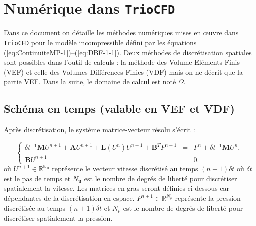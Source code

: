 \chapter{\label{sub:Numerique-dans-TrioCFD}Num\'erique dans \texttt{TrioCFD}}
Dans ce document on d\'etaille les m\'ethodes num\'eriques mises en \oe uvre
dans \texttt{TrioCFD} pour le mod\`ele incompressible d\'efini par les
\'equations (\ref{eq:ContinuiteMP-1})--(\ref{eq:DBF-1-1}). Deux m\'ethodes
de discr\'etisation spatiales sont possibles dans l'outil de calculs
: la m\'ethode des Volume-El\'ements Finis (VEF) et celle des Volumes
Diff\'erences Finies (VDF) mais on ne d\'ecrit que la partie VEF. Dans
la suite, le domaine de calcul est not\'e $\Omega$.


\section{Sch\'ema en temps (valable en VEF et VDF)}

Apr\`es discr\'etisation, le syst\`eme matrice-vecteur r\'esolu s'\'ecrit :

\begin{equation}
\left\{ \begin{array}{rcl}
\delta t^{-1}\mathbf{M}U^{n+1}+\mathbf{A}U^{n+1}+\mathbf{L}(U^{n})U^{n+1}+\mathbf{B}^{T}P^{n+1} & = & F^{n}+\delta t^{-1}\mathbf{M}U^{n},\\
\mathbf{B}U^{n+1} & = & 0.
\end{array}\right.\label{eq:NavierStokes-dis-FV}
\end{equation}
o\`u $U^{n+1}\in\mathbb{R^{N_{\mathbf{u}}}}$ repr\'esente le vecteur
vitesse discr\'etis\'e au temps $(n+1)\delta t$ o\`u $\delta t$ est le
pas de temps et $N_{\mathbf{u}}$ est le nombre de degr\'es de libert\'e
pour discr\'etiser spatialement la vitesse. Les matrices en gras seront
d\'efinies ci-dessous car d\'ependantes de la discr\'etisation en espace.
$P^{n+1}\in\mathbb{R}^{N_{p}}$ repr\'esente la pression discr\'etis\'ee
au temps $(n+1)\delta t$ et $N_{p}$ est le nombre de degr\'es de libert\'e
pour discr\'etiser spatialement la pression.

